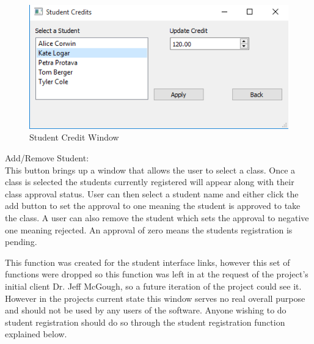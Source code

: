 \begin{figure}
  \includegraphics[width=\linewidth]{pics/userGuide/credits.png}
  \caption{Student Credit Window}
  \label{fig:User doc: Student Credits}
\end{figure}

Add/Remove Student:\\
This button brings up a window that allows the user to select a class. Once a class is selected the students currently registered will appear along with their class approval status. User can then select a student name and either click the add button to set the approval to one meaning the student is approved to take the class. A user can also remove the student which sets the approval to negative one meaning rejected. An approval of zero means the students registration is pending.

This function was created for the student interface links, however this set of functions were dropped so this function was left in at the request of the project's initial client Dr. Jeff McGough, so a future iteration of the project could see it. However in the projects current state this window serves no real overall purpose and should not be used by any users of the software. Anyone wishing to do student registration should do so through the student registration function explained below.\\



